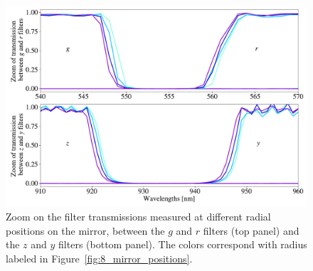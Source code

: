 \begin{figure}[h]
    \centering
    \includegraphics[width=1\columnwidth]{fig/blue_shift_filter_edges.pdf}
    \caption{Zoom on the \SD filter transmissions measured at different radial positions on the mirror, between the $g$ and $r$ filters (top panel) and the $z$ and $y$ filters (bottom panel). The colors correspond with radius labeled in Figure~\ref{fig:8_mirror_positions}.}
    \label{fig:blueshift}
\end{figure}

%
%









